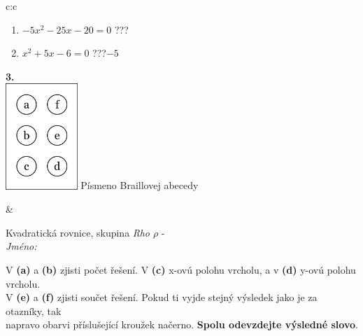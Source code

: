 \documentclass[10pt]{report}
\begin{document}
\begin{tabular}{c:c}
\begin{minipage}[c][104.5mm][t]{0.5\linewidth}
\begin{center}
\begin{minipage}{0.79\linewidth}
\begin{center}
\begin{varwidth}{\linewidth}
\begin{enumerate}
\item $-5x^2-25x-20=0$\quad \dotfill\; ???\;\dotfill {}
\item $x^2+5x-6=0$\quad \dotfill\; ???\;\dotfill \quad $-5$
\end{enumerate}
\end{varwidth}
\end{center}
\end{minipage}
\begin{minipage}{0.20\linewidth}
\begin{center}
{\Huge\bfseries 3.} \\[2mm]
\includegraphics[height=40mm]{../images/braille.png}
{\small Písmeno Braillovej abecedy}
\end{center}
\end{minipage}
\end{center}
\end{minipage}
&
\begin{minipage}[c][104.5mm][t]{0.5\linewidth}
\begin{center}
\vspace{7mm}
{\huge Kvadratická rovnice, skupina \textit{Rho $\rho$} -}\\[5mm]
\textit{Jméno:}\phantom{xxxxxxxxxxxxxxxxxxxxxxxxxxxxxxxxxxxxxxxxxxxxxxxxxxxxxxxxxxxxxxxxx}\\[5mm]
\begin{minipage}{0.95\linewidth}
\begin{center}
V \textbf{(a)} a \textbf{(b)} zjisti počet řešení. V \textbf{(c)} x-ovú polohu vrcholu, a v \textbf{(d)} y-ovú polohu vrcholu.\\V \textbf{(e)} a \textbf{(f)} zjisti součet řešení. Pokud ti vyjde stejný výsledek jako je za otazníky, tak\\napravo obarvi příslušející kroužek načerno. \textbf{Spolu odevzdejte výsledné slovo}.
\end{center}
\end{minipage}
\\[1mm]
\begin{minipage}{0.79\linewidth}
\begin{center}

\end{center}
\end{minipage}
\end{center}
\end{minipage}
\end{tabular}
\end{document}
